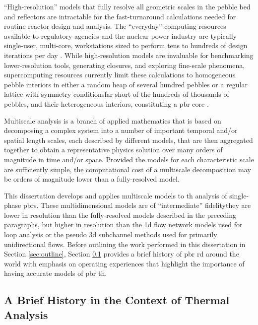 ``High-resolution'' models that fully resolve all geometric scales in the pebble bed and reflectors are intractable for the fast-turnaround calculations needed for routine reactor design and analysis. The ``everyday'' computing resources available to regulatory agencies and the nuclear power industry are typically single-user, multi-core, workstations sized to perform tens to hundreds of design iterations per day \cite{nrc_nonlwr}. While high-resolution models are invaluable for benchmarking lower-resolution tools, generating closures, and exploring fine-scale phenomena, supercomputing resources currently limit these calculations to homogeneous pebble interiors in either a random heap of several hundred pebbles or a regular lattice with symmetry conditions\mdash far short of the hundreds of thousands of pebbles, and their heterogeneous interiors, constituting a \gls{pbr} core \cite{calis,zhang2016,baker_2010,alkhalaf,guardo,gunjal}.

Multiscale analysis is a branch of applied mathematics that is based on decomposing a complex system into a number of important temporal and/or spatial length scales, each described by different models, that are then aggregated together to obtain a representative physics solution over many orders of magnitude in time and/or space. Provided the models for each characteristic scale are sufficiently simple, the computational cost of a multiscale decomposition may be orders of magnitude lower than a fully-resolved model. 

This dissertation develops and applies multiscale models to \gls{th} analysis of single-phase \glspl{pbr}. These multidimensional models are of ``intermediate'' fidelity\mdash they are lower in resolution than the fully-resolved models described in the preceding paragraphs, but higher in resolution than the \gls{1d} flow network models used for loop analysis or the pseudo \gls{3d} subchannel methods used for primarily unidirectional flows. Before outlining the work performed in this dissertation in Section \ref{sec:outline}, Section \ref{sec:history} provides a brief history of \gls{pbr} \gls{rd} around the world with emphasis on operating experiences that highlight the importance of having accurate models of \gls{pbr} \gls{th}. 

\subsection{A Brief History in the Context of Thermal Analysis}
\label{sec:history}

